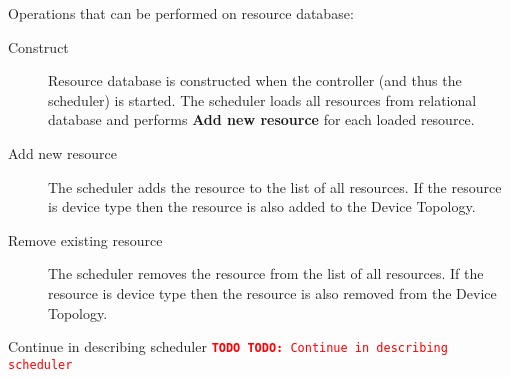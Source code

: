 \documentclass[a4paper]{report}
\newcommand{\TODO}[1]{%
\def\empty{}%
\def\prvniparametr{#1}%
\ifx\prvniparametr\empty%
\begingroup\tt\textcolor{red}{\noindent\textbf{TODO}}\endgroup
\else%
\begingroup\tt\textcolor{red}{\noindent\textbf{TODO:}\ #1}\endgroup
\fi%
}
\begin{document}
Operations that can be performed on resource database:

\begin{description}
\item[Construct]
Resource database is constructed when the controller (and thus the scheduler) is started. The scheduler loads all resources from relational database and performs \textbf{Add new resource} for each loaded resource.

\item[Add new resource]
The scheduler adds the resource to the list of all resources. If the resource is device type then the resource is also added to the Device Topology.

\item[Remove existing resource]
The scheduler removes the resource from the list of all resources. If the resource is device type then the resource is also removed from the Device Topology.
\end{description}

\TODO{Continue in describing scheduler}
\end{document}
